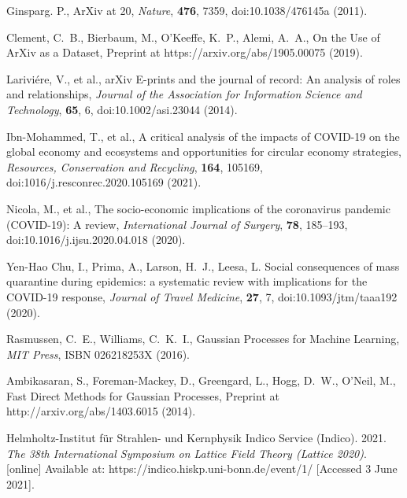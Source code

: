 \documentclass[a4paper,12pt]{article}
\begin{document}
\begin{thebibliography}{10}

{Ginsparg}. P., {ArXiv at 20}, \emph{Nature}, \textbf{476}, 7359, doi:10.1038/476145a \newblock (2011).

{Clement, C.~B., Bierbaum, M., O'Keeffe, K.~P., Alemi, A.~A.,}
{On the Use of ArXiv as a Dataset},
Preprint at https://arxiv.org/abs/1905.00075 \newblock (2019).

{Larivi{\'e}re, V., et al.,} {arXiv E-prints and the journal of record: An analysis of roles and relationships}, \emph{Journal of the Association for Information Science and Technology}, \textbf{65}, 6, doi:10.1002/asi.23044 \newblock (2014).

{Ibn-Mohammed, T., et al.,} {A critical analysis of the impacts of {COVID}-19 on the global economy and ecosystems and opportunities for circular economy strategies}, \emph{Resources, Conservation and Recycling}, \textbf{164}, 105169, doi:1016/j.resconrec.2020.105169 \newblock (2021).

{Nicola, M., et al.,} {The socio-economic implications of the coronavirus pandemic ({COVID}-19): A review}, \emph{International Journal of Surgery}, \textbf{78}, 185--193, doi:10.1016/j.ijsu.2020.04.018 \newblock (2020).

{Yen-Hao Chu, I., Prima, A., Larson, H.~J., Leesa, L.}
{Social consequences of mass quarantine during epidemics: a systematic review with implications for the {COVID}-19 response}, \emph{Journal of Travel Medicine}, \textbf{27}, 7, doi:10.1093/jtm/taaa192 \newblock (2020).


{Rasmussen, C.~E., Williams, C.~K.~I.,}
{Gaussian Processes for Machine Learning}, \emph{MIT Press}, ISBN 026218253X \newblock (2016).

{Ambikasaran, S., Foreman-Mackey, D., Greengard, L., Hogg, D.~W., O'Neil, M.,}
{Fast Direct Methods for Gaussian Processes}, Preprint at http://arxiv.org/abs/1403.6015 \newblock (2014).
 
Helmholtz-Institut f\"ur Strahlen- und Kernphysik Indico Service (Indico). 2021. \emph{The 38th International Symposium on Lattice Field Theory (Lattice 2020)}. [online] Available at: {https://indico.hiskp.uni-bonn.de/event/1/} [Accessed 3 June 2021].




\end{thebibliography}
\end{document}
